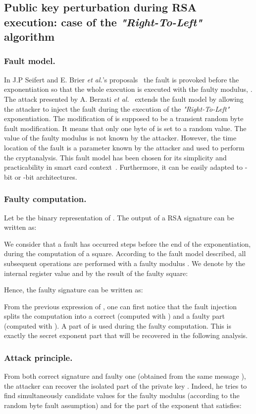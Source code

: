 \documentclass{article}
\begin{document}
\subsection{Public key perturbation during RSA execution: case of the \textit{"Right-To-Left"} algorithm}

\subsubsection{Fault model.}
In J.P Seifert and E. Brier \textit{et al.}'s proposals~\cite{67,6} the fault is provoked before the exponentiation so that the whole execution is executed with the faulty modulus, .\\
The attack presented by A. Berzati \textit{et al.}~\cite{77} extends the fault model by allowing the attacker to inject the fault during the execution of the \textit{"Right-To-Left"} exponentiation. The modification of  is supposed to be a transient random byte fault modification. It means that only one byte of  is set to a random value. The value of the faulty modulus  is not known by the attacker.
However, the time location of the fault is a parameter known by the attacker and used to perform the cryptanalysis. This fault model has been chosen for its simplicity and practicability in smart card context~\cite{25,7}. Furthermore, it can be easily adapted to -bit or -bit architectures. 

\subsubsection{Faulty computation.}
Let  be the binary representation of .  The output of a RSA signature can be written as:

We consider that a fault has occurred  steps before the end of the exponentiation, during the computation of a square. According to the fault model described, all subsequent operations are performed with a faulty modulus . We denote by  the internal register value and by  the result of the faulty square:

Hence, the faulty signature  can be written as:

From the previous expression of , one can first notice that the fault injection splits the computation into a correct (computed with ) and a faulty part (computed with ). A part of  is used during the faulty computation. This is exactly the secret exponent part that will be recovered in the following analysis.

\subsubsection{Attack principle.}
From both correct signature  and faulty one  (obtained
from the same message ), the attacker can recover the isolated part
of the private key . Indeed, he tries to find simultaneously candidate values for
the faulty modulus  (according to the random byte fault
assumption) and for the part of the exponent  that
satisfies:
\end{document}
